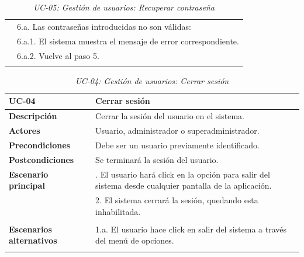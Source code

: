 \begin{table}
\begin{center}
\begin{tabularx}{16.4cm}{|l|X|}
      & 6.a. Las contraseñas introducidas no son válidas:\\
      & \hspace{0.3cm} 6.a.1. El sistema muestra el mensaje de error correspondiente.\\
      & \hspace{0.3cm} 6.a.2. Vuelve al paso 5.\\
      & \\
      \hline
    \end{tabularx}
    \caption{\textit{UC-05: Gestión de usuarios: Recuperar contraseña}}
    \label{tab:CU-restablecer-contrasena}
  \end{center}
\end{table}


\begin{table}[H]
  \begin{center}
    \begin{tabularx}{16.4cm}{|l|X|}
      \hline
      \textbf{UC-04} & \textbf{Cerrar sesión}\\
      \hline
      \textbf{Descripción} & Cerrar la sesión del usuario en el sistema.\\
      \hline
      \textbf{Actores} & Usuario, administrador o superadministrador.\\
      \hline
      \textbf{Precondiciones} & Debe ser un usuario previamente identificado.\\
      \hline
      \textbf{Postcondiciones} & Se terminará la sesión del usuario.\\
      \hline
      \textbf{Escenario principal} & \smallskip 1. El usuario hará click en la opción para salir del sistema desde cualquier pantalla de la aplicación.\\
      & 2. El sistema cerrará la sesión, quedando esta inhabilitada.\\
      & \\
      \hline
      \textbf{Escenarios alternativos} & \smallskip 1.a. El usuario hace click en salir del sistema a través del menú de opciones.\\
      & \\
      \hline
    \end{tabularx}
    \caption{\textit{UC-04: Gestión de usuarios: Cerrar sesión}}
    \label{tab:CU-cerrar-sesion}
  \end{center}
\end{table}


